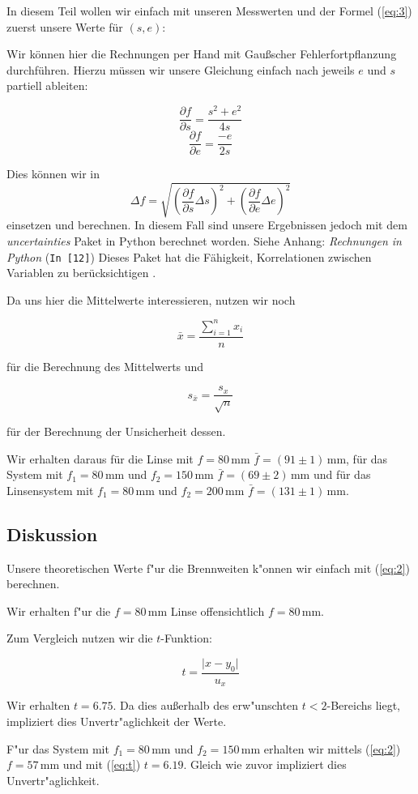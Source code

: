 \documentclass[11pt,a4paper]{article}
\newcommand{\refpy}[1]{Siehe Anhang: \textit{Rechnungen in Python} (\texttt{{\color{incolor}In [{\color{incolor}#1}]}})}
\newcommand\mean{\begin{equation}
\bar{x}=\frac{\sum_{i=1}^n x_{i}}{n}\label{mean}
\end{equation}}
\newcommand\meanstd{\begin{equation}
s_{\bar{x}}=\frac{s_x}{\sqrt{n}}\label{meanstd}
\end{equation}}
\begin{document}
In diesem Teil wollen wir einfach mit unseren Messwerten und der Formel (\ref{eq:3}) zuerst unsere Werte f\"ur $(s,e)$:



Wir k\"onnen hier die Rechnungen per Hand mit Gau\ss scher Fehlerfortpflanzung durchf\"uhren. Hierzu m\"ussen wir unsere Gleichung einfach nach jeweils $e$ und $s$ partiell ableiten:

\[
\frac{\partial f}{\partial s}=\frac{s^2+e^2}{4s}
\]
\[
\frac{\partial f}{\partial e}=\frac{-e}{2s}
\]

Dies k\"onnen wir in
\[
\Delta f=\sqrt{\left(\frac{\partial f}{\partial s}\Delta s\right)^2+\left(\frac{\partial f}{\partial e}\Delta e\right)^2}
\]
einsetzen und berechnen. In diesem Fall sind unsere Ergebnissen jedoch mit dem \textit{uncertainties} Paket in Python berechnet worden. \refpy{12} Dieses Paket hat die F\"ahigkeit, Korrelationen zwischen Variablen zu ber\"ucksichtigen \cite{Uncertainties}.

Da uns hier die Mittelwerte interessieren, nutzen wir noch

\mean

f\"ur die Berechnung des Mittelwerts und

\meanstd

f\"ur der Berechnung der Unsicherheit dessen.

Wir erhalten daraus f\"ur die Linse mit $f=80\,$mm $\bar{f}=(91\pm1)\,$mm, f\"ur das System mit $f_1=80\,$mm und $f_2=150\,$mm $\bar{f}=(69\pm2)\,$mm und f\"ur das Linsensystem mit $f_1=80\,$mm und $f_2=200\,$mm $\bar{f}=(131\pm1)\,$mm.

\subsection{Diskussion}

Unsere theoretischen Werte f"ur die Brennweiten k"onnen wir einfach mit (\ref{eq:2}) berechnen. 

Wir erhalten f"ur die $f=80\,$mm Linse offensichtlich $f=80$\,mm.

Zum Vergleich nutzen wir die $t$-Funktion:

\begin{equation}
t=\frac{\vert x-y_0\vert}{u_x}\label{eq:t}
\end{equation}

Wir erhalten $t=6.75$. Da dies au\ss erhalb des erw"unschten $t<2$-Bereichs liegt, impliziert dies Unvertr"aglichkeit der Werte.

F"ur das System mit $f_1=80\,$mm und $f_2=150\,$mm erhalten wir mittels (\ref{eq:2}) $f=57\,$mm und mit (\ref{eq:t}) $t=6.19$. Gleich wie zuvor impliziert dies Unvertr"aglichkeit.
\end{document}
